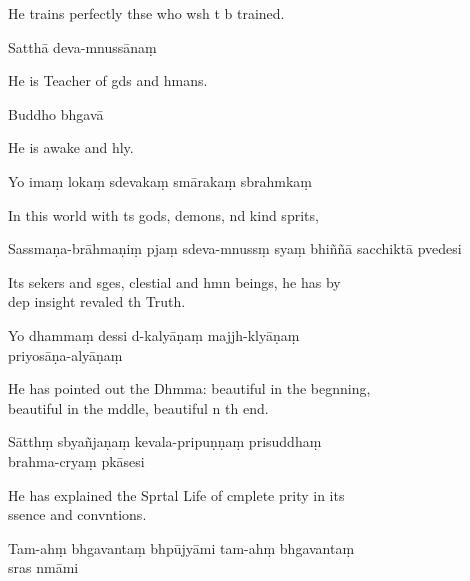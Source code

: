 \begin{english}
  He trains perfectly thse who wsh t b trained.
\end{english}

Satthā deva-mnussānaṃ

\begin{english}
  He is Teacher of gds and hmans.
\end{english}

Buddho bhgavā

\begin{english}
  He is awake and hly.
\end{english}

Yo imaṃ lokaṃ sdevakaṃ smārakaṃ sbrahmkaṃ

\begin{english}
  In this world with ts gods, demons, nd kind sprits,
\end{english}

Sassmaṇa-brāhmaṇiṃ pjaṃ sdeva-mnussṃ syaṃ bhiññā sacchiktā pvedesi

\begin{english}
  Its sekers and sges, clestial and hmn beings, he has by \\d{}ep insight revaled th Truth.
\end{english}

Yo dhammaṃ dessi d-kalyāṇaṃ majjh-klyāṇaṃ \\p{}riyosāṇa-alyāṇaṃ

\begin{english}
  He has pointed out the Dhmma: beautiful in the begnning, \\beautiful in the mddle, beautiful n th end.
\end{english}

Sātthṃ sbyañjaṇaṃ kevala-pripuṇṇaṃ prisuddhaṃ \\brahma-cryaṃ pkāsesi

\begin{english}
  He has explained the Sprtal Life of cmplete prity in its \\ssence and convntions.
\end{english}

Tam-ahṃ bhgavantaṃ bhpūjyāmi tam-ahṃ bhgavantaṃ \\s{}ras nmāmi

